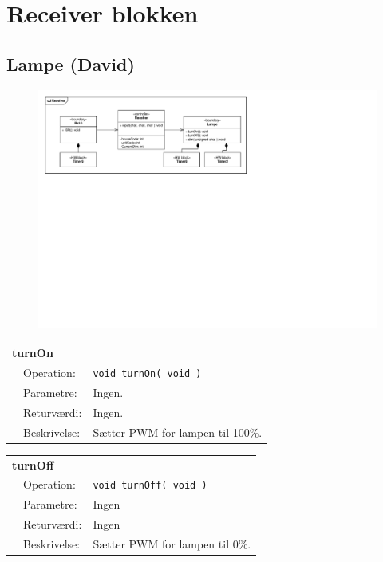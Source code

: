\section{Receiver blokken}

\subsection{Lampe (David)}

\begin{figure}[h]
\centering
\includegraphics[scale=1,clip=true, trim=361.8 462 335 50]{Systemarkitektur/diagrammer/Receiver_KlasseDiagram} %
\end{figure}

\begin{table}[h]
\begin{tabularx}{\textwidth}{p{0.6 cm} l X} %

\multicolumn{3}{l}{\textbf{turnOn}}\\
& Operation: & %
\texttt{void turnOn( void )}
\\ & Parametre: & %
Ingen.
\\ & Returværdi: & %
Ingen.
\\ & Beskrivelse: & %
Sætter PWM for lampen til 100\%.

\\ \end{tabularx}
\end{table}

\begin{table}[h]
\begin{tabularx}{\textwidth}{p{0.6 cm} l X} %

\multicolumn{3}{l}{\textbf{turnOff}}\\
& Operation: & %
\texttt{void turnOff( void )}
\\ & Parametre: & %
Ingen
\\ & Returværdi: & %
Ingen
\\ & Beskrivelse: & %
Sætter PWM for lampen til 0\%.

\\ \end{tabularx}
\end{table}

